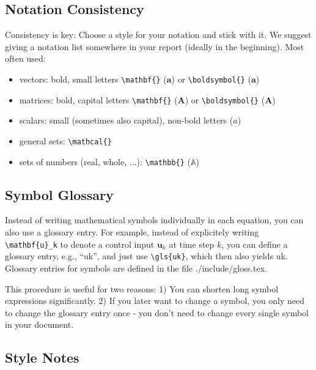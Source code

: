 \subsection{Notation Consistency}

Consistency is key: Choose a style for your notation and stick with it. We suggest giving a notation list somewhere in your report (ideally in the beginning). 
Most often used:
\begin{itemize}
	\item vectors: bold, small letters \verb|\mathbf{}| ($\mathbf{a}$) or \verb|\boldsymbol{}| ($\boldsymbol{a}$)
	\item matrices: bold, capital letters \verb|\mathbf{}| ($\mathbf{A}$) or \verb|\boldsymbol{}| ($\boldsymbol{A}$)
	\item scalars: small (sometimes also capital), non-bold letters ($a$)
	\item general sets: \verb|\mathcal{}|
	\item sets of numbers (real, whole, $\ldots$): \verb|\mathbb{}| ($\mathbb{A}$)
\end{itemize}

\subsection{Symbol Glossary}

Instead of writing mathematical symbols individually in each equation, you can also use a glossary entry. For example, instead of explicitely writing \verb|\mathbf{u}_k| to denote a control input $\mathbf{u}_k$ at time step $k$, you can define a glossary entry, e.g., ``uk'', and just use \verb|\gls{uk}|, which then also yields \gls{uk}. Glossary entries for symbols are defined in the file ./include/gloss.tex.

This procedure is useful for two reasons: 1) You can shorten long symbol expressions significantly. 2) If you later want to change a symbol, you only need to change the glossary entry once - you don't need to change every single symbol in your document.

\subsection{Style Notes}

